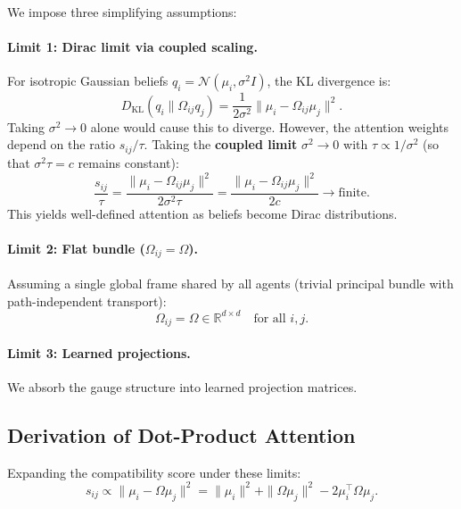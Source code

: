 \documentclass[twoside,11pt]{article}
\begin{document}
We impose three simplifying assumptions:

\paragraph{Limit 1: Dirac limit via coupled scaling.}
For isotropic Gaussian beliefs $q_i = \mathcal{N}(\mu_i, \sigma^2 I)$, the KL divergence is:
\begin{equation}
D_{\mathrm{KL}}(q_i \| \Omega_{ij} q_j) = \frac{1}{2\sigma^2}\|\mu_i - \Omega_{ij}\mu_j\|^2.
\end{equation}
Taking $\sigma^2 \to 0$ alone would cause this to diverge. However, the attention weights depend on the ratio $s_{ij}/\tau$. Taking the \textbf{coupled limit} $\sigma^2 \to 0$ with $\tau \propto 1/\sigma^2$ (so that $\sigma^2 \tau = c$ remains constant):
\begin{equation}
\frac{s_{ij}}{\tau} = \frac{\|\mu_i - \Omega_{ij}\mu_j\|^2}{2\sigma^2 \tau} = \frac{\|\mu_i - \Omega_{ij}\mu_j\|^2}{2c} \to \text{finite}.
\end{equation}
This yields well-defined attention as beliefs become Dirac distributions.

\paragraph{Limit 2: Flat bundle ($\Omega_{ij} = \Omega$).}
Assuming a single global frame shared by all agents (trivial principal bundle with path-independent transport):
\begin{equation}
\Omega_{ij} = \Omega \in \mathbb{R}^{d \times d} \quad \text{for all } i,j.
\end{equation}

\paragraph{Limit 3: Learned projections.}
We absorb the gauge structure into learned projection matrices.

\subsection{Derivation of Dot-Product Attention}

Expanding the compatibility score under these limits:
\begin{equation}
s_{ij} \propto \|\mu_i - \Omega\mu_j\|^2 = \|\mu_i\|^2 + \|\Omega\mu_j\|^2 - 2\mu_i^\top \Omega \mu_j.
\end{equation}
\end{document}
